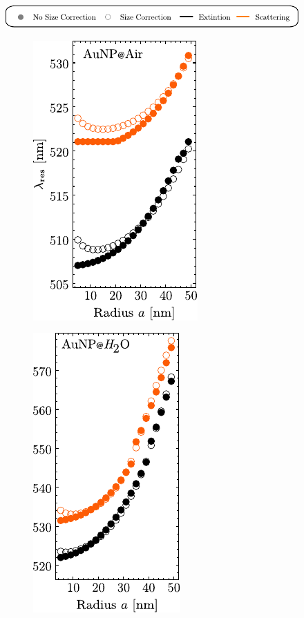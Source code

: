 \begin{figure}[h!]\centering
	\includegraphics[scale=1]{1-Theory/figs/legend.pdf}\\[.5em]
%
	\hspace*{2em}\begin{subfigure}{.05\textwidth}\caption{}\label{sfig:secondary1}\vspace*{6.35cm}\end{subfigure}
	\hspace*{-3.50em}
	\begin{subfigure}{.24\textwidth} \includegraphics[scale = 1]{1-Theory/figs/redShift_rad1.pdf}\end{subfigure}
%	
	\hspace*{.25em}\begin{subfigure}{.05\textwidth}\vspace{-6.35cm}\caption{}\label{sfig:secondaty2}	\end{subfigure}
	\hspace*{-2.5em}
	\begin{subfigure}{.24\textwidth} \includegraphics[scale = 1]{1-Theory/figs/redShift_rad2.pdf}\end{subfigure}%

\end{figure}
